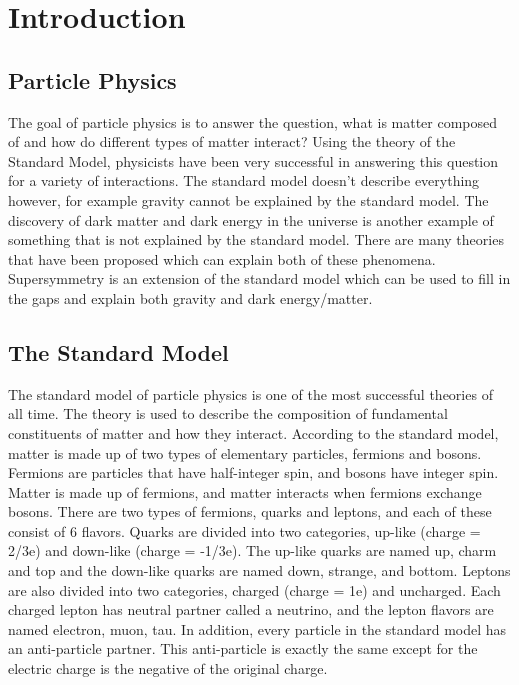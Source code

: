 \chapter{Introduction}
\label{ch:intro}

\section{Particle Physics}
The goal of particle physics is to answer the question, what is matter composed of and how do different types of matter interact?
Using the theory of the Standard Model, physicists have been very successful in answering this question for a variety of interactions.
The standard model doesn't describe everything however, for example gravity cannot be explained by the standard model.
The discovery of dark matter and dark energy in the universe is another example of something that is not explained by the standard model.
There are many theories that have been proposed which can explain both of these phenomena.
Supersymmetry is an extension of the standard model which can be used to fill in the gaps and explain both gravity and dark energy/matter.

\section{The Standard Model}
The standard model of particle physics is one of the most successful theories of all time.
The theory is used to describe the composition of fundamental constituents of matter and how they interact.
According to the standard model, matter is made up of two types of elementary particles, fermions and bosons.
Fermions are particles that have half-integer spin, and bosons have integer spin.
Matter is made up of fermions, and matter interacts when fermions exchange bosons.
There are two types of fermions, quarks and leptons, and each of these consist of 6 flavors.
Quarks are divided into two categories, up-like (charge = 2/3e) and down-like (charge = -1/3e).
The up-like quarks are named up, charm and top and the down-like quarks are named down, strange, and bottom.
Leptons are also divided into two categories, charged (charge = 1e) and uncharged.
Each charged lepton has neutral partner called a neutrino, and the lepton flavors are named electron, muon, tau.
In addition, every particle in the standard model has an anti-particle partner.
This anti-particle is exactly the same except for the electric charge is the negative of the original charge.

